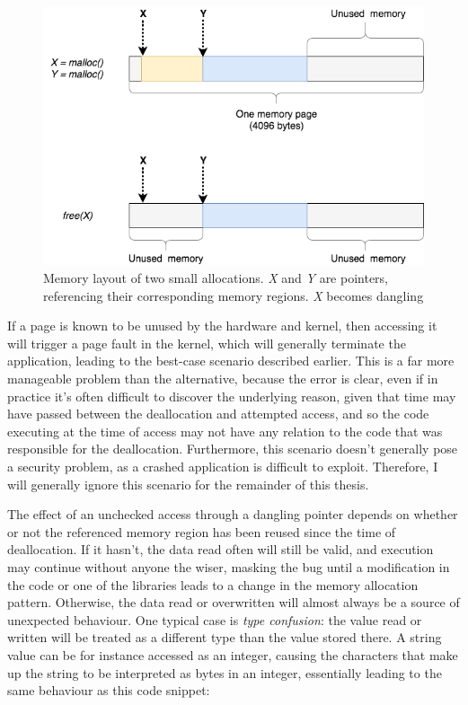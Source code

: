 \begin{figure}
    \centering
    \includegraphics[width=\textwidth]{img/dangling_pointer_basics.png}
    \caption{Memory layout of two small allocations. \emph{X} and \emph{Y} are pointers, referencing their corresponding memory regions. \emph{X} becomes dangling}
    \label{fig:mem_two_small_allocs}
\end{figure}

If a page is known to be unused by the hardware and kernel, then accessing it will trigger a page fault in the kernel, which will generally terminate the application, leading to the best-case scenario described earlier. This is a far more manageable problem than the alternative, because the error is clear, even if in practice it's often difficult to discover the underlying reason, given that time may have passed between the deallocation and attempted access, and so the code executing at the time of access may not have any relation to the code that was responsible for the deallocation. Furthermore, this scenario doesn't generally pose a security problem, as a crashed application is difficult to exploit. Therefore, I will generally ignore this scenario for the remainder of this thesis.

The effect of an unchecked access through a dangling pointer depends on whether or not the referenced memory region has been reused since the time of deallocation. If it hasn't, the data read often will still be valid, and execution may continue without anyone the wiser, masking the bug until a modification in the code or one of the libraries leads to a change in the memory allocation pattern. Otherwise, the data read or overwritten will almost always be a source of unexpected behaviour. One typical case is \emph{type confusion}: the value read or written will be treated as a different type than the value stored there. A string value can be for instance accessed as an integer, causing the characters that make up the string to be interpreted as bytes in an integer, essentially leading to the same behaviour as this code snippet:

